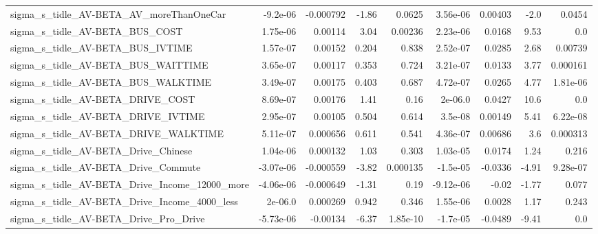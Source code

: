 \begin{tabular}{lrrrrrrrr}
sigma\_s\_tidle\_AV-BETA\_AV\_moreThanOneCar            &    -9.2e-06 &    -0.000792 &     -1.86 &   0.0625 &   3.56e-06 &     0.00403 &         -2.0 &        0.0454 \\
sigma\_s\_tidle\_AV-BETA\_BUS\_COST                     &    1.75e-06 &      0.00114 &      3.04 &  0.00236 &   2.23e-06 &      0.0168 &         9.53 &           0.0 \\
sigma\_s\_tidle\_AV-BETA\_BUS\_IVTIME                   &    1.57e-07 &      0.00152 &     0.204 &    0.838 &   2.52e-07 &      0.0285 &         2.68 &       0.00739 \\
sigma\_s\_tidle\_AV-BETA\_BUS\_WAITTIME                 &    3.65e-07 &      0.00117 &     0.353 &    0.724 &   3.21e-07 &      0.0133 &         3.77 &      0.000161 \\
sigma\_s\_tidle\_AV-BETA\_BUS\_WALKTIME                 &    3.49e-07 &      0.00175 &     0.403 &    0.687 &   4.72e-07 &      0.0265 &         4.77 &      1.81e-06 \\
sigma\_s\_tidle\_AV-BETA\_DRIVE\_COST                   &    8.69e-07 &      0.00176 &      1.41 &     0.16 &    2e-06.0 &      0.0427 &         10.6 &           0.0 \\
sigma\_s\_tidle\_AV-BETA\_DRIVE\_IVTIME                 &    2.95e-07 &      0.00105 &     0.504 &    0.614 &    3.5e-08 &     0.00149 &         5.41 &      6.22e-08 \\
sigma\_s\_tidle\_AV-BETA\_DRIVE\_WALKTIME               &    5.11e-07 &     0.000656 &     0.611 &    0.541 &   4.36e-07 &     0.00686 &          3.6 &      0.000313 \\
sigma\_s\_tidle\_AV-BETA\_Drive\_Chinese                &    1.04e-06 &     0.000132 &      1.03 &    0.303 &   1.03e-05 &      0.0174 &         1.24 &         0.216 \\
sigma\_s\_tidle\_AV-BETA\_Drive\_Commute                &   -3.07e-06 &    -0.000559 &     -3.82 & 0.000135 &   -1.5e-05 &     -0.0336 &        -4.91 &      9.28e-07 \\
sigma\_s\_tidle\_AV-BETA\_Drive\_Income\_12000\_more      &   -4.06e-06 &    -0.000649 &     -1.31 &     0.19 &  -9.12e-06 &       -0.02 &        -1.77 &         0.077 \\
sigma\_s\_tidle\_AV-BETA\_Drive\_Income\_4000\_less       &     2e-06.0 &     0.000269 &     0.942 &    0.346 &   1.55e-06 &      0.0028 &         1.17 &         0.243 \\
sigma\_s\_tidle\_AV-BETA\_Drive\_Pro\_Drive              &   -5.73e-06 &     -0.00134 &     -6.37 & 1.85e-10 &   -1.7e-05 &     -0.0489 &        -9.41 &           0.0 \\

\end{tabular}
